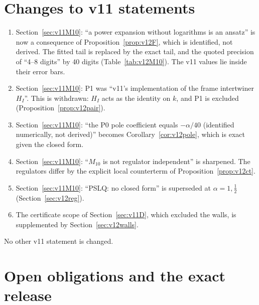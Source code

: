 \documentclass[11pt,a4paper]{article}
\theoremstyle{plain}
\theoremstyle{definition}
\theoremstyle{remark}
\numberwithin{equation}{section}
\begin{document}
\section{Changes to v11 statements}
\label{sec:v12changes}

\begin{enumerate}[label=(C\arabic*)]
\item Section~\ref{sec:v11M10}: ``a power expansion without
logarithms is an ansatz'' is now a consequence of
Proposition~\ref{prop:v12F}, which is identified, not derived. The
fitted tail is replaced by the exact tail, and the quoted precision
of ``4--8 digits'' by 40 digits (Table~\ref{tab:v12M10}). The v11
values lie inside their error bars.
\item Section~\ref{sec:v11M10}: P1 was ``v11's implementation of the
frame intertwiner \(H_I\)''. This is withdrawn: \(H_I\) acts as the
identity on \(k\), and P1 is excluded (Proposition~\ref{prop:v12pair}).
\item Section~\ref{sec:v11M10}: ``the P0 pole coefficient equals
\(-\alpha/40\) (identified numerically, not derived)'' becomes
Corollary~\ref{cor:v12pole}, which is exact given the closed form.
\item Section~\ref{sec:v11M10}: ``\(M_{10}\) is not regulator
independent'' is sharpened. The regulators differ by the explicit
local counterterm of Proposition~\ref{prop:v12ct}.
\item Section~\ref{sec:v11M10}: ``PSLQ: no closed form'' is
superseded at \(\alpha=1,\tfrac12\) (Section~\ref{sec:v12reg}).
\item The certificate scope of Section~\ref{sec:v11D}, which excluded
the walls, is supplemented by Section~\ref{sec:v12walls}.
\end{enumerate}
No other v11 statement is changed.

\section{Open obligations and the exact release}
\label{sec:release}
\end{document}
